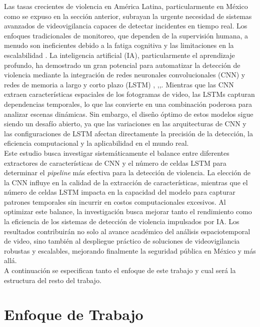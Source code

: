 Las tasas crecientes de violencia en América Latina, 
particularmente en México como se expuso en la sección anterior, 
subrayan la urgente necesidad de sistemas avanzados de 
videovigilancia capaces de detectar incidentes en tiempo real. 
Los enfoques tradicionales de monitoreo, que dependen de la supervisión 
humana, a menudo son ineficientes debido a la fatiga cognitiva y 
las limitaciones en la escalabilidad \cite{Marois2021}. La inteligencia 
artificial (IA), particularmente el aprendizaje profundo, ha demostrado 
un gran potencial para automatizar la detección de violencia mediante 
la integración de redes neuronales convolucionales (CNN) y redes de 
memoria a largo y corto plazo (LSTM) , ,,. 
Mientras que las CNN extraen características espaciales de los 
fotogramas de video, las LSTMs capturan dependencias temporales, 
lo que las convierte en una combinación poderosa para analizar 
escenas dinámicas. Sin embargo, el diseño óptimo de estos modelos 
sigue siendo un desafío abierto, ya que las variaciones en las 
arquitecturas de CNN y las configuraciones de LSTM afectan directamente 
la precisión de la detección, la eficiencia computacional y la aplicabilidad 
en el mundo real.\\

Este estudio busca investigar sistemáticamente el balance 
entre diferentes extractores de características de CNN y el número 
de celdas LSTM para determinar el \textit{pipeline} más efectiva para la 
detección de violencia. La elección de la CNN influye en la calidad 
de la extracción de características, mientras que el número de celdas 
LSTM impacta en la capacidad del modelo para capturar patrones temporales 
sin incurrir en costos computacionales excesivos. Al optimizar este 
balance, la investigación busca mejorar tanto el rendimiento como 
la eficiencia de los sistemas de detección de violencia impulsados por IA. 
Los resultados contribuirán no solo al avance académico del análisis 
espaciotemporal de video, sino también al despliegue práctico de soluciones 
de videovigilancia robustas y escalables, mejorando finalmente la seguridad 
pública en México y más allá.\\

A continuación se especifican tanto el enfoque de este 
trabajo y cual será la estructura del resto del 
trabajo.

\section{Enfoque de Trabajo}

